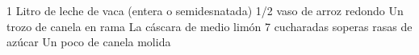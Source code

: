 1 Litro de leche de vaca (entera o semidesnatada)
1/2 vaso de arroz redondo
Un trozo de canela en rama
La cáscara de medio limón
7 cucharadas soperas rasas de azúcar
Un poco de canela molida
